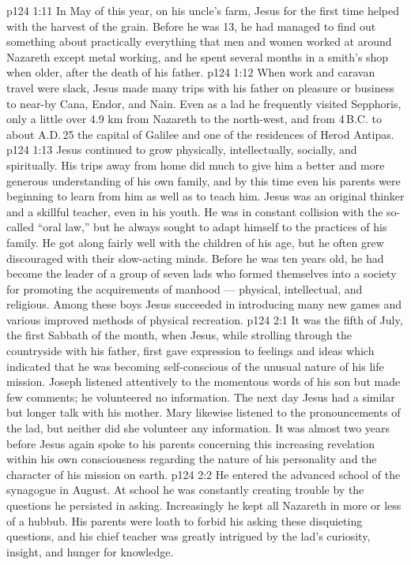 \vs p124 1:11 \pc In May of this year, on his uncle’s farm, Jesus for the first time helped with the harvest of the grain. Before he was 13, he had managed to find out something about practically everything that men and women worked at around Nazareth except metal working, and he spent several months in a smith’s shop when older, after the death of his father.
\vs p124 1:12 When work and caravan travel were slack, Jesus made many trips with his father on pleasure or business to near\hyp{}by Cana, Endor, and Nain. Even as a lad he frequently visited Sepphoris, only a little over 4.9 km from Nazareth to the north\hyp{}west, and from 4\,B.C. to about A.D.\,25 the capital of Galilee and one of the residences of Herod Antipas.
\vs p124 1:13 Jesus continued to grow physically, intellectually, socially, and spiritually. His trips away from home did much to give him a better and more generous understanding of his own family, and by this time even his parents were beginning to learn from him as well as to teach him. Jesus was an original thinker and a skillful teacher, even in his youth. He was in constant collision with the so\hyp{}called “oral law,” but he always sought to adapt himself to the practices of his family. He got along fairly well with the children of his age, but he often grew discouraged with their slow\hyp{}acting minds. Before he was ten years old, he had become the leader of a group of seven lads who formed themselves into a society for promoting the acquirements of manhood --- physical, intellectual, and religious. Among these boys Jesus succeeded in introducing many new games and various improved methods of physical recreation.
\vs p124 2:1 It was the fifth of July, the first Sabbath of the month, when Jesus, while strolling through the countryside with his father, first gave expression to feelings and ideas which indicated that he was becoming self\hyp{}conscious of the unusual nature of his life mission. Joseph listened attentively to the momentous words of his son but made few comments; he volunteered no information. The next day Jesus had a similar but longer talk with his mother. Mary likewise listened to the pronouncements of the lad, but neither did she volunteer any information. It was almost two years before Jesus again spoke to his parents concerning this increasing revelation within his own consciousness regarding the nature of his personality and the character of his mission on earth.
\vs p124 2:2 \pc He entered the advanced school of the synagogue in August. At school he was constantly creating trouble by the questions he persisted in asking. Increasingly he kept all Nazareth in more or less of a hubbub. His parents were loath to forbid his asking these disquieting questions, and his chief teacher was greatly intrigued by the lad’s curiosity, insight, and hunger for knowledge.
